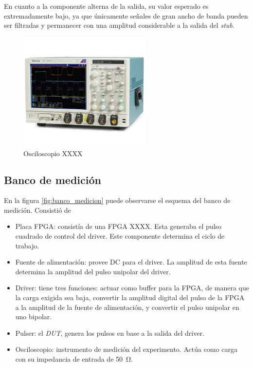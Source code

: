 En cuanto a la componente alterna de la salida, su valor esperado es
extremadamente bajo, ya que únicamente señales de gran ancho de banda pueden ser
filtradas y permanecer con una amplitud considerable a la salida del 
\textit{stub}.

\begin{figure}
  \centering
    \includegraphics[width=0.6\textwidth]{images/osciloscopio.png}
    \caption{Osciloscopio XXXX}
    \label{fig:osciloscopio}
\end{figure}

\subsection{Banco de medición}

En la figura \ref{fig:banco_medicion} puede observarse el esquema del banco de
medición. Consistió de

\begin{itemize}
    \item Placa FPGA: consistía de una FPGA XXXX. Esta generaba el pulso
        cuadrado de control del driver. Este componente determina el ciclo de
        trabajo.
    \item Fuente de alimentación: provee DC para el driver. La amplitud de esta
        fuente determina la amplitud del pulso unipolar del driver.
    \item Driver: tiene tres funciones: actuar como buffer para la FPGA, de
        manera que la carga exigida sea baja, convertir la amplitud digital del
        pulso de la FPGA a la amplitud de la fuente de alimentación, y convertir
        el pulso unipolar en uno bipolar.
    \item Pulser: el \textit{DUT}, genera los pulsos en base a la salida del driver.
    \item Osciloscopio: instrumento de medición del experimento. Actúa como
      carga con su impedancia de entrada de \qty{50}{\ohm}.
\end{itemize}

